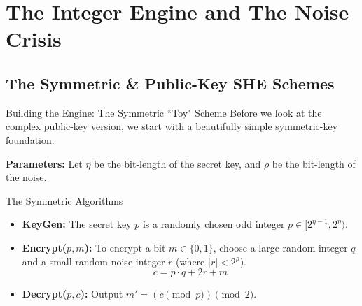 \documentclass[10pt]{beamer}
\begin{document}
\section{The Integer Engine and The Noise Crisis}
\subsection{The Symmetric \& Public-Key SHE Schemes}

\begin{frame}{Building the Engine: The Symmetric ``Toy" Scheme}
    Before we look at the complex public-key version, we start with a beautifully simple symmetric-key foundation.
    \pause
    
    \vspace{0.3cm}
    \textbf{Parameters:} Let $\eta$ be the bit-length of the secret key, and $\rho$ be the bit-length of the noise.
    \pause
    
    \begin{block}{The Symmetric Algorithms}
    \begin{itemize}
        \item \textbf{KeyGen:} The secret key $p$ is a randomly chosen odd integer $p \in [2^{\eta-1}, 2^{\eta})$.
        \item \textbf{Encrypt($p, m$):} To encrypt a bit $m \in \{0,1\}$, choose a large random integer $q$ and a small random noise integer $r$ (where $|r| < 2^{\rho}$). 
        $$c = p \cdot q + 2r + m$$
        \item \textbf{Decrypt($p, c$):} Output $m' = (c \pmod p) \pmod 2$.
    \end{itemize}
    \end{block}
\end{frame}
\end{document}
